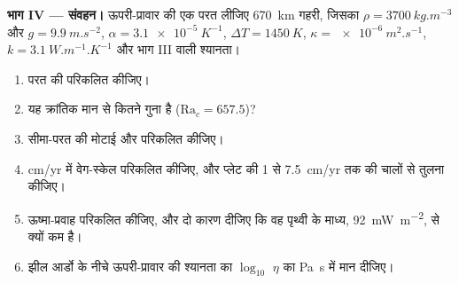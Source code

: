 \begin{problem}
\medskip\noindent\textbf{भाग IV --- संवहन।} ऊपरी-प्रावार की एक परत लीजिए
\qty{670}{km} गहरी, जिसका $\rho = \qty{3700}{kg.m^{-3}}$ और $g =
\qty{9.9}{m.s^{-2}}$, $\alpha = \qty{3.1e-5}{K^{-1}}$, $\Delta T =
\qty{1450}{K}$, $\kappa = \qty{e-6}{m^2.s^{-1}}$, $k = \qty{3.1}{W.m^{-1}.K^{-1}}$
और भाग III वाली श्यानता।
\begin{enumerate}[resume]
  \item परत की  परिकलित कीजिए।
  \item यह क्रांतिक मान से कितने गुना है ($\mathrm{Ra}_c = 657.5$)?
  \item सीमा-परत की मोटाई और  परिकलित कीजिए।
  \item \unit{cm/yr} में वेग-स्केल परिकलित कीजिए, और
        प्लेट की 1 से \qty{7.5}{cm/yr} तक की चालों से तुलना कीजिए।
  \item ऊष्मा-प्रवाह परिकलित कीजिए, और दो कारण दीजिए कि वह पृथ्वी के
        माध्य, \qty{92}{mW.m^{-2}}, से क्यों कम है।
  \item झील आर्डो के नीचे ऊपरी-प्रावार की श्यानता का $\log_{10}$
        $\eta$ का \unit{Pa.s} में मान दीजिए।
\end{enumerate}
\end{problem}
